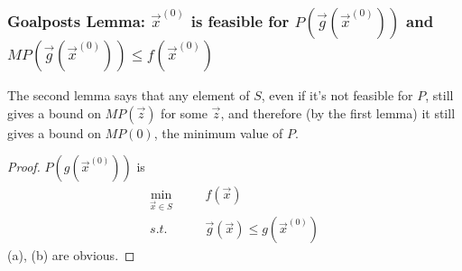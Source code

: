 \documentclass[11pt,a4paper]{article}
\newtheorem{lemma}{Lemma}
\begin{document}
\subsubsection{Goalposts Lemma: $\vec{x}^{(0)}$ is feasible for $P(\vec{g}(\vec{x}^{(0)}))$ and $MP(\vec{g}(\vec{x}^{(0)}))\leq f(\vec{x}^{(0)})$}
\begin{center}
\end{center}
The second lemma says that any element of $S$, even if it's not feasible for $P$, still gives a bound on $MP(\vec{z})$ for some $\vec{z}$, and therefore (by the first lemma) it still gives a bound on $MP(0)$, the minimum value of $P$.
\begin{proof}
    $P(g(\vec{x}^{(0)}))$ is
    \begin{equation}
        \begin{aligned}
            \min_{\vec{x}\in S}&\quad &f(\vec{x})\\
            s.t.& &\vec{g}(\vec{x})\leq g(\vec{x}^{(0)})
        \end{aligned}
        \nonumber
    \end{equation}
    (a), (b) are obvious.
\end{proof}
\end{document}
